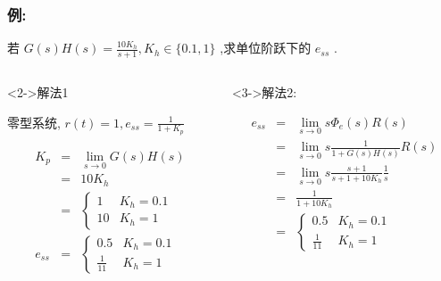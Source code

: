 \documentclass{beamer}
\begin{document}
\begin{frame}
\frametitle{例:}
\label{sec-2-10}


若 $G(s)H(s) =\frac{10K_h}{s+1},K_h\in\{0.1,1\}$ ,求单位阶跃下的 $e_{ss}$ .

\begin{columns}
\begin{column}{0.45\textwidth}
\begin{block}<2->{解法1}
\label{sec-2-10-1}


零型系统, $r(t)=1,e_{ss}=\frac{1}{1+K_p}$

\begin{eqnarray*}
K_p &=  &\lim_{s\rightarrow 0}G(s)H(s) \\
    &=& 10K_h \\
    &=&
\begin{cases}
1  & K_h =0.1 \\
10 & K_h = 1
\end{cases}\\
e_{ss} &=&
\begin{cases}
0.5 & K_h=0.1 \\
\frac{1}{11} & K_h=1
\end{cases}
\end{eqnarray*}
\end{block}
\end{column}
\begin{column}{0.45\textwidth}
\begin{block}<3->{解法2:}
\label{sec-2-10-2}


\begin{eqnarray*}
e_{ss} &=& \lim_{s\rightarrow 0}s\Phi_e(s)R(s)\\
    &=&\lim_{s\rightarrow 0}s\frac{1}{1+G(s)H(s)}R(s)\\
    &=&\lim_{s\rightarrow 0}s\frac{s+1}{s+1+10K_h}\frac{1}{s}\\
    &=& \frac{1}{1+10K_h} \\
    &=&
\begin{cases}
0.5 & K_h=0.1 \\
\frac{1}{11} & K_h=1
\end{cases}
\end{eqnarray*}
\end{block}
\end{column}
\end{columns}
\end{frame}
\end{document}
